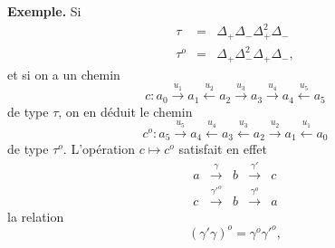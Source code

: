 \textbf{Exemple.} Si
\[
\begin{array}{rcl}
\tau & = & \Delta_+\Delta_-\Delta_+^2\Delta_-\\
\tau^o & = & \Delta_+\Delta_-^2\Delta_+\Delta_-,
\end{array}
\]
et si on a un chemin
\[
c : a_0 \xrightarrow{u_1} a_1 \xleftarrow{u_2} a_2 \xrightarrow{u_3} a_3 \xrightarrow{u_4} a_4 \xleftarrow{u_5} a_5
\]
de type $\tau$, on en déduit le chemin
\[
c^o : a_5 \xrightarrow{u_5} a_4 \xleftarrow{u_4} a_3 \xleftarrow{u_3} a_2 \xrightarrow{u_2} a_1 \xleftarrow{u_1} a_0
\]
de type $\tau^o$. L'opération $c \longmapsto c^o$ satisfait en
effet
\[
\begin{array}{ccccc}
a & \xrightarrow{\gamma} & b & \xrightarrow{\gamma'} & c\\
c & \xrightarrow{\gamma'^o} & b & \xrightarrow{\gamma^o} & a
\end{array}
\]
la relation
\[
(\gamma'\gamma)^o = \gamma^o\gamma'^o, \tag*{$(*)$}
\]

